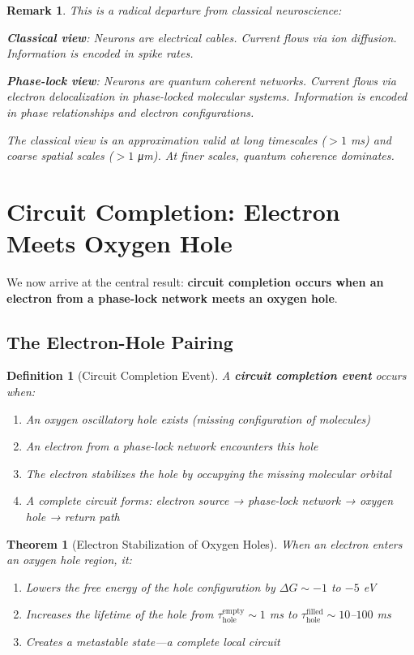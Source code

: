\documentclass[12pt,a4paper]{article}
\newtheorem{theorem}{Theorem}
\newtheorem{definition}{Definition}
\newtheorem{remark}{Remark}
\begin{document}
\begin{remark}
This is a radical departure from classical neuroscience:

\textbf{Classical view}: Neurons are electrical cables. Current flows via ion diffusion. Information is encoded in spike rates.

\textbf{Phase-lock view}: Neurons are quantum coherent networks. Current flows via electron delocalization in phase-locked molecular systems. Information is encoded in phase relationships and electron configurations.

The classical view is an approximation valid at long timescales ($> 1$ ms) and coarse spatial scales ($> 1$ μm). At finer scales, quantum coherence dominates.
\end{remark}

\section{Circuit Completion: Electron Meets Oxygen Hole}

We now arrive at the central result: \textbf{circuit completion occurs when an electron from a phase-lock network meets an oxygen hole}.

\subsection{The Electron-Hole Pairing}

\begin{definition}[Circuit Completion Event]
\label{def:circuit_completion}
A \textbf{circuit completion event} occurs when:
\begin{enumerate}
\item An oxygen oscillatory hole exists (missing configuration of  molecules)
\item An electron from a phase-lock network encounters this hole
\item The electron stabilizes the hole by occupying the missing molecular orbital
\item A complete circuit forms: electron source → phase-lock network → oxygen hole → return path
\end{enumerate}
\end{definition}

\begin{theorem}[Electron Stabilization of Oxygen Holes]
\label{thm:electron_stabilization}
When an electron enters an oxygen hole region, it:
\begin{enumerate}
\item Lowers the free energy of the hole configuration by $\Delta G \sim -1$ to $-5$ eV
\item Increases the lifetime of the hole from $\tau_{\text{hole}}^{\text{empty}} \sim 1$ ms to $\tau_{\text{hole}}^{\text{filled}} \sim 10$--$100$ ms
\item Creates a metastable state—a \textit{complete local circuit}
\end{enumerate}
\end{theorem}
\end{document}
